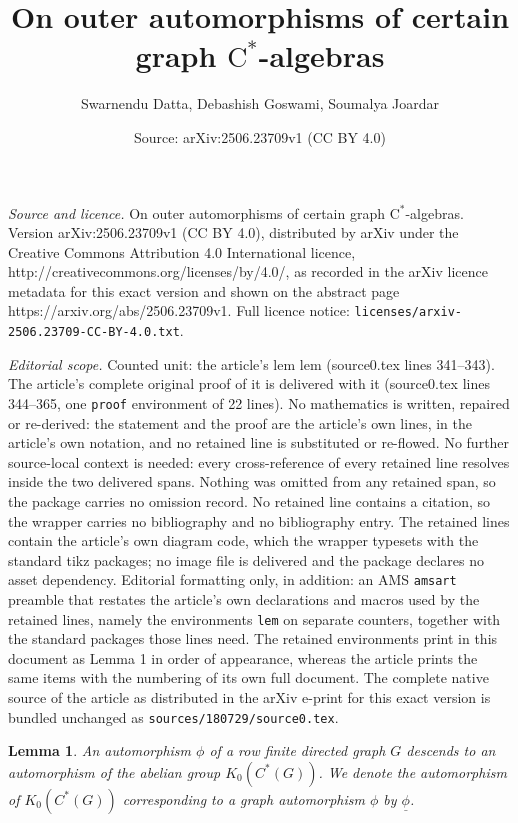 \documentclass[10pt,a4paper]{amsart}
\title{On outer automorphisms of certain graph $\textrm{C}^{\ast}$-algebras}
\author{Swarnendu Datta, Debashish Goswami, Soumalya Joardar}
\date{Source: arXiv:2506.23709v1 (CC BY 4.0)}
\newtheorem{lem}{Lemma}
\begin{document}
\maketitle

\noindent\emph{Source and licence.} On outer automorphisms of certain graph $\textrm{C}^{\ast}$-algebras. Version arXiv:2506.23709v1 (CC BY 4.0), distributed by arXiv under the Creative Commons Attribution 4.0 International licence, http://creativecommons.org/licenses/by/4.0/, as recorded in the arXiv licence metadata for this exact version and shown on the abstract page https://arxiv.org/abs/2506.23709v1. Full licence notice: \texttt{licenses/arxiv-2506.23709-CC-BY-4.0.txt}.\par\smallskip

\noindent\textit{Editorial scope.} Counted unit: the article's lem lem (source0.tex lines 341--343). The article's complete original proof of it is delivered with it (source0.tex lines 344--365, one \texttt{proof} environment of 22 lines). No mathematics is written, repaired or re-derived: the statement and the proof are the article's own lines, in the article's own notation, and no retained line is substituted or re-flowed.  No further source-local context is needed: every cross-reference of every retained line resolves inside the two delivered spans.  Nothing was omitted from any retained span, so the package carries no omission record.  No retained line contains a citation, so the wrapper carries no bibliography and no bibliography entry.  The retained lines contain the article's own diagram code, which the wrapper typesets with the standard tikz packages; no image file is delivered and the package declares no asset dependency.  Editorial formatting only, in addition: an AMS \texttt{amsart} preamble that restates the article's own declarations and macros used by the retained lines, namely the environments \texttt{lem} on separate counters, together with the standard packages those lines need.  The retained environments print in this document as Lemma 1 in order of appearance, whereas the article prints the same items with the numbering of its own full document.  The complete native source of the article as distributed in the arXiv e-print for this exact version is bundled unchanged as \texttt{sources/180729/source0.tex}.
            \begin{lem}
              An automorphism $\phi$ of a row finite directed graph $G$ descends to an automorphism of the abelian group $K_{0}(C^{\ast}(G))$. We denote the automorphism of $K_{0}(C^{\ast}(G))$ corresponding to a graph automorphism $\phi$ by $\underline{\phi}$.
            \end{lem}
\end{document}
